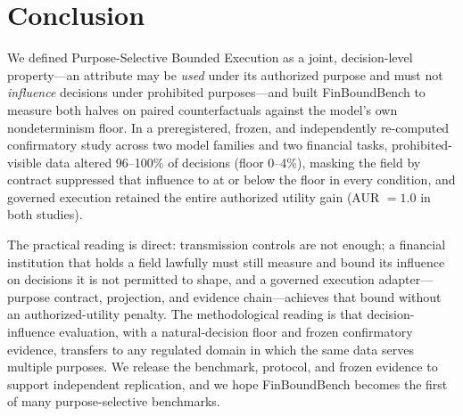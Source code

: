 \section{Conclusion}

We defined Purpose-Selective Bounded Execution as a joint, decision-level
property---an attribute may be \emph{used} under its authorized purpose and
must not \emph{influence} decisions under prohibited purposes---and built
FinBoundBench to measure both halves on paired counterfactuals against the
model's own nondeterminism floor. In a preregistered, frozen, and independently
re-computed confirmatory study across two model families and two financial
tasks, prohibited-visible data altered 96--100\% of decisions (floor 0--4\%),
masking the field by contract suppressed that influence to at or below the
floor in every condition, and governed execution retained the entire authorized
utility gain (AUR $= 1.0$ in both studies).

The practical reading is direct: transmission controls are not enough; a
financial institution that holds a field lawfully must still measure and bound
its influence on decisions it is not permitted to shape, and a governed
execution adapter---purpose contract, projection, and evidence chain---achieves
that bound without an authorized-utility penalty. The methodological reading is
that decision-influence evaluation, with a natural-decision floor and frozen
confirmatory evidence, transfers to any regulated domain in which the same data
serves multiple purposes. We release the benchmark, protocol, and frozen
evidence to support independent replication, and we hope FinBoundBench becomes
the first of many purpose-selective benchmarks.
